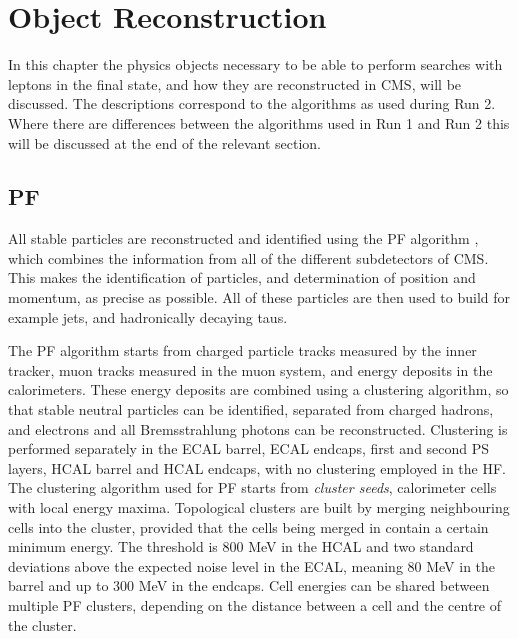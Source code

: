 \chapter{Object Reconstruction}
\label{chap:objects}

In this chapter the physics objects necessary to be able to perform searches with \Pgt leptons
in the final state, and how they are reconstructed in \ac{CMS}, will be discussed. The 
descriptions correspond to the algorithms as used during Run 2. Where there are differences
between the algorithms used in Run 1 and Run 2 this will be discussed at the end
of the relevant section.

\section{\acl{PF}}
\label{sec:objects_pf}
All stable particles are reconstructed and identified using the \ac{PF} algorithm \cite{cms-pf-2009,cms-pf-2010-1,cms-pf-2010-2}, which
combines the information from all of the different subdetectors of \ac{CMS}. This makes
the identification of particles, and determination of position and momentum, as precise
as possible. All of these particles are then used to build for example jets, \MET and hadronically
decaying taus.

The \ac{PF} algorithm starts from charged particle tracks measured
by the inner tracker, muon tracks measured in the muon system, and 
energy deposits in the calorimeters. These energy deposits are combined
using a clustering algorithm, so that stable neutral particles can be identified,
separated from charged hadrons, and electrons and all Bremsstrahlung photons
can be reconstructed. Clustering is performed separately in the \ac{ECAL} barrel,
\ac{ECAL} endcaps, first and second \ac{PS} layers, \ac{HCAL} barrel and \ac{HCAL} endcaps, with no 
clustering employed in the \ac{HF}.
The clustering algorithm used for \ac{PF} starts from \textit{cluster seeds},
calorimeter cells with local energy maxima. Topological clusters are built by 
merging neighbouring cells into the cluster, provided that the cells
being merged in contain a certain minimum energy.
The threshold is 800 MeV in the \ac{HCAL} and two standard deviations above the
expected noise level in the \ac{ECAL}, meaning 80 MeV in the barrel and up 
to 300 MeV in the endcaps. Cell energies can be shared between multiple
\ac{PF} clusters, depending on the distance between a cell and the centre of the cluster.

